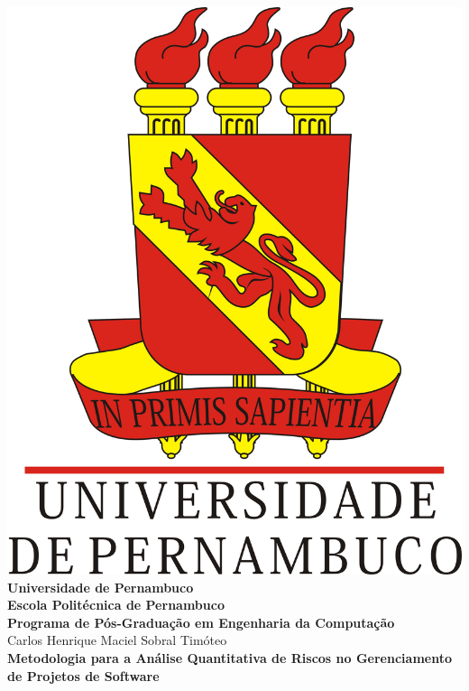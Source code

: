 \begin{titlepage}

  \begin{center}
	\includegraphics[scale=0.17]{image/UPE_brasao}\\
	\textbf{Universidade de Pernambuco}\\
	\textbf{Escola Politécnica de Pernambuco}\\
    \textbf{Programa de Pós-Graduação em Engenharia da Computação}\\[3cm]

    Carlos Henrique Maciel Sobral Timóteo\\[2cm]
{
\Large
    \textbf{Metodologia para a Análise Quantitativa de Riscos no Gerenciamento de Projetos de Software}\\[2cm]
}
  \end{center}

\noindent{}


\end{titlepage}
